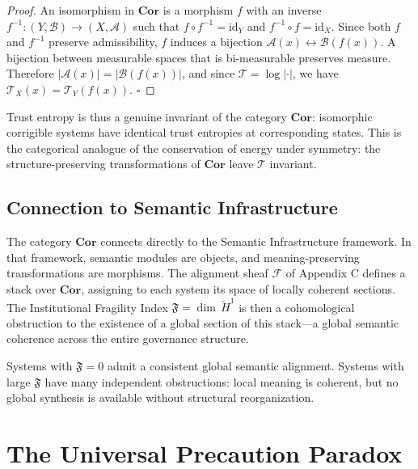 \documentclass[11pt,a4paper]{article}
\theoremstyle{definition}
\theoremstyle{plain}
\begin{document}
\begin{mdframed}[style=appendixbox]
\begin{proof}
An isomorphism in $\mathbf{Cor}$ is a morphism $f$ with an inverse $f^{-1} : (Y, \mathcal{B}) \to (X, \mathcal{A})$ such that $f \circ f^{-1} = \mathrm{id}_Y$ and $f^{-1} \circ f = \mathrm{id}_X$. Since both $f$ and $f^{-1}$ preserve admissibility, $f$ induces a bijection $\mathcal{A}(x) \leftrightarrow \mathcal{B}(f(x))$. A bijection between measurable spaces that is bi-measurable preserves measure. Therefore $|\mathcal{A}(x)| = |\mathcal{B}(f(x))|$, and since $\mathcal{T} = \log|\cdot|$, we have $\mathcal{T}_X(x) = \mathcal{T}_Y(f(x))$. $\square$
\end{proof}

Trust entropy is thus a genuine invariant of the category $\mathbf{Cor}$: isomorphic corrigible systems have identical trust entropies at corresponding states. This is the categorical analogue of the conservation of energy under symmetry: the structure-preserving transformations of $\mathbf{Cor}$ leave $\mathcal{T}$ invariant.

\subsection{Connection to Semantic Infrastructure}

The category $\mathbf{Cor}$ connects directly to the Semantic Infrastructure framework. In that framework, semantic modules are objects, and meaning-preserving transformations are morphisms. The alignment sheaf $\mathcal{F}$ of Appendix C defines a stack over $\mathbf{Cor}$, assigning to each system its space of locally coherent sections. The Institutional Fragility Index $\mathfrak{F} = \dim\,\check{H}^1$ is then a cohomological obstruction to the existence of a global section of this stack---a global semantic coherence across the entire governance structure.

Systems with $\mathfrak{F} = 0$ admit a consistent global semantic alignment. Systems with large $\mathfrak{F}$ have many independent obstructions: local meaning is coherent, but no global synthesis is available without structural reorganization.

\end{mdframed}

\section*{The Universal Precaution Paradox}
\end{document}
